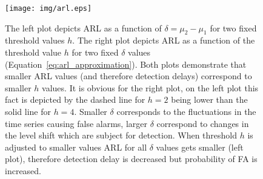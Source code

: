 %
\begin{figure}[!htb]
	\centering
	\texttt{[image: img/arl.eps]}
	\caption{
    The left plot depicts ARL as a function of $\delta = \mu_2-\mu_1$ for two fixed threshold values $h$. The right plot depicts ARL as a function of the threshold value $h$ for two fixed $\delta$ values (Equation~\ref{eq:arl_approximation}).
    Both plots demonstrate that smaller ARL values (and therefore detection delays) correspond to smaller $h$ values. It is obvious for the right plot, on the left plot this fact is depicted by the dashed line for $h=2$ being lower than the solid line for $h=4$.
    Smaller $\delta$ corresponds to the fluctuations in the time series causing false alarms, larger $\delta$ correspond to changes in the level shift which are subject for detection.
    When threshold $h$ is adjusted to smaller values ARL for all $\delta$ values gets smaller (left plot), therefore detection delay is decreased but probability of FA is increased.
}\label{fig:arl}
\end{figure}


